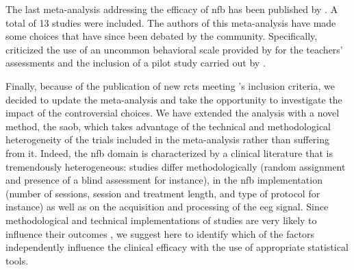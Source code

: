 The last meta-analysis addressing the efficacy of \gls{nfb} has been published by \citet{Cortese2016}. A total of 13
studies were included. The authors of this meta-analysis have made some choices that
have since been debated by the community. Specifically, \citet{Micoulaud2016} criticized the use of an uncommon
behavioral scale provided by \citet{Steiner2014} for the teachers' assessments and the inclusion of a pilot study
carried out by \citet{Arnold2014}. 

Finally, because of the publication of new \glspl{rct} meeting \citeauthor{Cortese2016}'s inclusion criteria, we
decided to update the meta-analysis and take the opportunity to investigate the impact of the controversial choices.
We have extended the analysis with a novel method, the \gls{saob}, which takes advantage of the technical and
methodological heterogeneity of the trials included in the meta-analysis rather than suffering from it. Indeed, the \gls{nfb} domain is 
characterized by a clinical literature that is tremendously heterogeneous: studies differ methodologically (random assignment and 
presence of a blind assessment for instance), in the \gls{nfb} implementation (number of sessions, session and treatment length,
and type of protocol for instance) as well as on the acquisition and processing of the \gls{eeg} signal. Since
methodological and technical implementations of studies are very likely to influence their outcomes \citep{Congedo2004}, we suggest here 
to identify which of the factors independently influence the clinical efficacy with the use of appropriate statistical tools.






